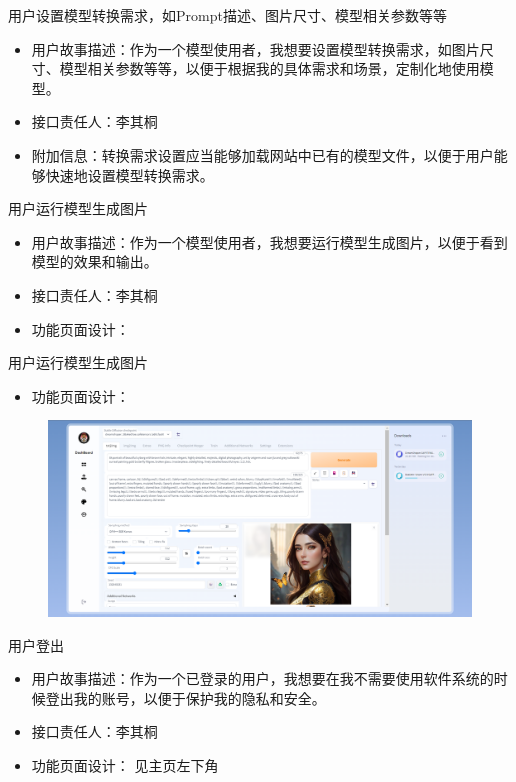 \begin{frame}{用户设置模型转换需求，如Prompt描述、图片尺寸、模型相关参数等等}
    \begin{itemize}
        \item 用户故事描述：作为一个模型使用者，我想要设置模型转换需求，如图片尺寸、模型相关参数等等，以便于根据我的具体需求和场景，定制化地使用模型。
        \item 接口责任人：李其桐
        \item 附加信息：转换需求设置应当能够加载网站中已有的模型文件，以便于用户能够快速地设置模型转换需求。
    \end{itemize}
\end{frame}

\begin{frame}{用户运行模型生成图片}
    \begin{itemize}
        \item 用户故事描述：作为一个模型使用者，我想要运行模型生成图片，以便于看到模型的效果和输出。
        \item 接口责任人：李其桐
        \item 功能页面设计：
    \end{itemize}
\end{frame}

\begin{frame}{用户运行模型生成图片}
    \begin{itemize}
        \item 功能页面设计：
    \end{itemize}
    \begin{figure}[H]
        \centering
        \includegraphics[width=\textwidth]{contents/figure/txt2img.png}
    \end{figure}
\end{frame}

\begin{frame}{用户登出}
    \begin{itemize}
        \item 用户故事描述：作为一个已登录的用户，我想要在我不需要使用软件系统的时候登出我的账号，以便于保护我的隐私和安全。
        \item 接口责任人：李其桐
        \item 功能页面设计： 见主页左下角
    \end{itemize}
\end{frame}